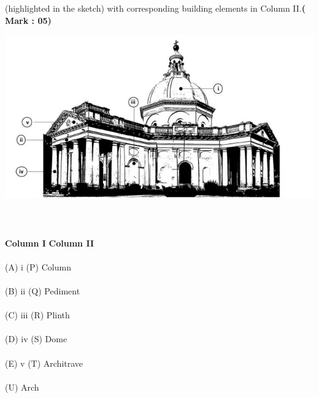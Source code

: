 \documentclass[10pt]{article}
\begin{document}
(highlighted in the sketch) with corresponding building elements in Column II.\hspace{10ex}\textbf{( Mark : 05)}
    

\includegraphics[width=1\linewidth]{q3.jpg}
\\ \\ \\ 
%
\\
\hspace*{4ex}\textbf{Column I} \tab \textbf{Column II} 
\\ \\
\hspace*{4ex}(A)  i   \tab (P) Column 
\\ \\
\hspace*{4ex}(B)  ii    \tab (Q) Pediment 
\\ \\
\hspace*{4ex}(C) iii \tab (R) Plinth 
\\ \\
\hspace*{4ex}(D) iv   \tab (S)  Dome 
\\ \\
\hspace*{4ex}(E) v  \tab (T)   Architrave 
\\ \\
\hspace*{4ex} \tab (U) Arch
 \\ \\ \\ \\ \\ \\ \\ \\ \\ \\ \\ \\ \\ \\ \\ \\
\end{document}
